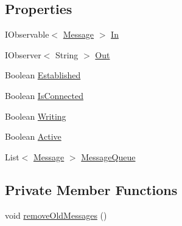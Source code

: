 \subsection*{Properties}
\begin{DoxyCompactItemize}
\item 
I\+Observable$<$ \hyperlink{class_web_analyzer_1_1_models_1_1_message_model_1_1_message}{Message} $>$ \hyperlink{class_web_analyzer_1_1_server_1_1_websocket_connection_aaff532a55d94eaddd75a2619da307c6a}{In}
\item 
I\+Observer$<$ String $>$ \hyperlink{class_web_analyzer_1_1_server_1_1_websocket_connection_a1f0be7b1ff80c5b742204d0883157578}{Out}
\item 
Boolean \hyperlink{class_web_analyzer_1_1_server_1_1_websocket_connection_a913e4dc6584670baea40f5c57a4dedf1}{Established}
\item 
Boolean \hyperlink{class_web_analyzer_1_1_server_1_1_websocket_connection_a54d71b7e50589c027fff5441dea6ca54}{Is\+Connected}
\item 
Boolean \hyperlink{class_web_analyzer_1_1_server_1_1_websocket_connection_a973edb4f0e5e1644f551bf132ae77183}{Writing}
\item 
Boolean \hyperlink{class_web_analyzer_1_1_server_1_1_websocket_connection_af64b83d9aec7d436a262f732e3b03e0b}{Active}
\item 
List$<$ \hyperlink{class_web_analyzer_1_1_models_1_1_message_model_1_1_message}{Message} $>$ \hyperlink{class_web_analyzer_1_1_server_1_1_websocket_connection_a0351f67ba0d69e6d5701ef34395e0a59}{Message\+Queue}
\end{DoxyCompactItemize}
\subsection*{Private Member Functions}
\begin{DoxyCompactItemize}
\item 
void \hyperlink{class_web_analyzer_1_1_server_1_1_websocket_connection_ab856bbd336338d41ea2196df96a39521}{remove\+Old\+Messages} ()
\end{DoxyCompactItemize}

